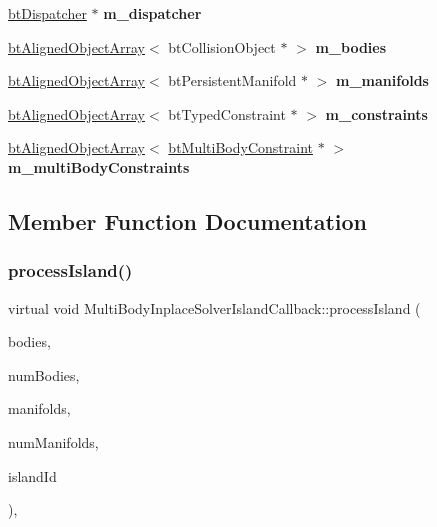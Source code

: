 \begin{DoxyCompactItemize}
\hyperlink{classbtDispatcher}{bt\+Dispatcher} $\ast$ {\bfseries m\+\_\+dispatcher}
\item 
\mbox{\label{structMultiBodyInplaceSolverIslandCallback_adc3284709ad82e2a864374629454770a}} 
\hyperlink{classbtAlignedObjectArray}{bt\+Aligned\+Object\+Array}$<$ bt\+Collision\+Object $\ast$ $>$ {\bfseries m\+\_\+bodies}
\item 
\mbox{\label{structMultiBodyInplaceSolverIslandCallback_ac75aa7916f93b3f00228e8279d90b681}} 
\hyperlink{classbtAlignedObjectArray}{bt\+Aligned\+Object\+Array}$<$ bt\+Persistent\+Manifold $\ast$ $>$ {\bfseries m\+\_\+manifolds}
\item 
\mbox{\label{structMultiBodyInplaceSolverIslandCallback_a263a82f0c95e0d5e770886d8a74d51ce}} 
\hyperlink{classbtAlignedObjectArray}{bt\+Aligned\+Object\+Array}$<$ bt\+Typed\+Constraint $\ast$ $>$ {\bfseries m\+\_\+constraints}
\item 
\mbox{\label{structMultiBodyInplaceSolverIslandCallback_a3d99e0484bb15883837b84d232e22796}} 
\hyperlink{classbtAlignedObjectArray}{bt\+Aligned\+Object\+Array}$<$ \hyperlink{classbtMultiBodyConstraint}{bt\+Multi\+Body\+Constraint} $\ast$ $>$ {\bfseries m\+\_\+multi\+Body\+Constraints}
\end{DoxyCompactItemize}


\subsection{Member Function Documentation}
\mbox{\label{structMultiBodyInplaceSolverIslandCallback_a4de885af1dc5369ee882827e010afd4b}} 
\subsubsection{\texorpdfstring{process\+Island()}{processIsland()}}
{\footnotesize\ttfamily virtual void Multi\+Body\+Inplace\+Solver\+Island\+Callback\+::process\+Island (\begin{DoxyParamCaption}\item[{bt\+Collision\+Object $\ast$$\ast$}]{bodies,  }\item[{int}]{num\+Bodies,  }\item[{bt\+Persistent\+Manifold $\ast$$\ast$}]{manifolds,  }\item[{int}]{num\+Manifolds,  }\item[{int}]{island\+Id }\end{DoxyParamCaption})\hspace{0.3cm}{\ttfamily [inline]}, {\ttfamily [virtual]}}

